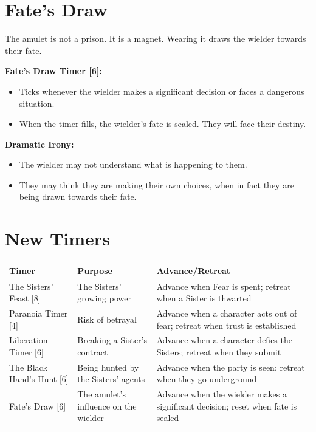 \documentclass[11pt,twoside]{book}
\newenvironment{mechanicbox}{\begin{mdframed}[style=mechanicbox]}{\end{mdframed}}
\begin{document}
\section{Fate's Draw}

The amulet is not a prison. It is a magnet. Wearing it draws the wielder towards their fate.

\begin{mechanicbox}
\textbf{Fate's Draw Timer [6]:}
\begin{itemize}
    \item Ticks whenever the wielder makes a significant decision or faces a dangerous situation.
    \item When the timer fills, the wielder's fate is sealed. They will face their destiny.
\end{itemize}

\textbf{Dramatic Irony:}
\begin{itemize}
    \item The wielder may not understand what is happening to them.
    \item They may think they are making their own choices, when in fact they are being drawn towards their fate.
\end{itemize}
\end{mechanicbox}

\section{New Timers}

\begin{tabularx}{\textwidth}{>{\raggedright\arraybackslash}p{} >{\raggedright\arraybackslash}p{} >{\raggedright\arraybackslash}p{}}
\toprule
\textbf{Timer} & \textbf{Purpose} & \textbf{Advance/Retreat} \\
\midrule
The Sisters' Feast [8] & The Sisters' growing power & Advance when Fear is spent; retreat when a Sister is thwarted \\
Paranoia Timer [4] & Risk of betrayal & Advance when a character acts out of fear; retreat when trust is established \\
Liberation Timer [6] & Breaking a Sister's contract & Advance when a character defies the Sisters; retreat when they submit \\
The Black Hand's Hunt [6] & Being hunted by the Sisters' agents & Advance when the party is seen; retreat when they go underground \\
Fate's Draw [6] & The amulet's influence on the wielder & Advance when the wielder makes a significant decision; reset when fate is sealed \\
\bottomrule
\end{tabularx}
\end{document}
